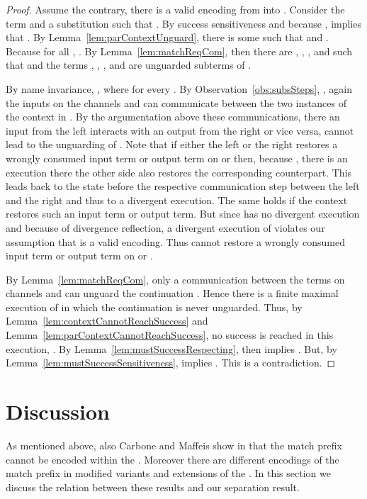 \documentclass[]{article}
\begin{document}
\begin{proof}
	Assume the contrary, \ie there is a valid encoding \encod from \piT into \piNM.
	Consider the term  and a substitution  such that .
	By success sensitiveness and because ,  implies that .
	By Lemma~\ref{lem:parContextUnguard}, there is some  such that  and .
	Because  for all , .
	By Lemma~\ref{lem:matchReqCom}, then there are , , , and  such that  and the terms , , , and  are unguarded subterms of .


	By name invariance, , where  for every .
	By Observation~\ref{obs:subsSteps}, , \ie again the inputs on the channels  and  can communicate between the two instances of the context  in .
	By the argumentation above these communications, \ie there an input from the left  interacts with an output from the right  or vice versa, cannot lead to the unguarding of .
	Note that if either the left  or the right  restores a wrongly consumed input term or output term on  or  then, because , there is an execution there the other side also restores the corresponding counterpart. This leads back to the state before the respective communication step between the left  and the right  and thus to a divergent execution.
	The same holds if the context  restores such an input term or output term.
	But since  has no divergent execution and because of divergence reflection, a divergent execution of  violates our assumption that \encod is a valid encoding.
	Thus  cannot restore a wrongly consumed input term or output term on  or .
	
	By Lemma~\ref{lem:matchReqCom}, only a communication between the terms on channels  and  can unguard the continuation . Hence there is a finite maximal execution of  in which the continuation  is never unguarded.
	Thus, by Lemma~\ref{lem:contextCannotReachSuccess} and Lemma~\ref{lem:parContextCannotReachSuccess}, no success is reached in this execution, \ie .
	By Lemma~\ref{lem:mustSuccessRespecting}, then  implies .
	But, by Lemma~\ref{lem:mustSuccessSensitiveness},  implies .
	This is a contradiction.
\end{proof}



\section{Discussion}
\label{sec:discussion}

As mentioned above, also Carbone and Maffeis show in \cite{carbone} that the match prefix cannot be encoded within the \piCal. Moreover there are different encodings of the match prefix in modified variants and extensions of the \piCal. In this section we discuss the relation between these results and our separation result.
\end{document}

